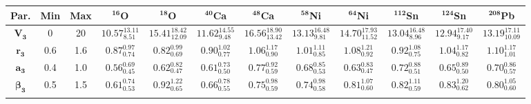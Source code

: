 \bgroup
\def\arraystretch{1.5}%
\begin{tabular}{ c c c c c c c c c c c c} 
\textbf{Par.} & \textbf{Min} & \textbf{Max} & \textbf{$\mathbf{^{16}}$O}& \textbf{$\mathbf{^{18}}$O}& \textbf{$\mathbf{^{40}}$Ca}& \textbf{$\mathbf{^{48}}$Ca}& \textbf{$\mathbf{^{58}}$Ni}& \textbf{$\mathbf{^{64}}$Ni}& \textbf{$\mathbf{^{112}}$Sn}& \textbf{$\mathbf{^{124}}$Sn}& \textbf{$\mathbf{^{208}}$Pb}\\
 \hline 
$\mathbf{V_{3}}$ & 0 & 20 & $10.57^{13.11}_{8.51}$ & $15.41^{18.42}_{12.09}$ & $11.62^{14.55}_{9.48}$ & $16.56^{18.90}_{13.42}$ & $13.13^{16.48}_{9.81}$ & $14.70^{17.93}_{11.52}$ & $13.04^{16.48}_{8.96}$ & $12.94^{17.40}_{9.17}$ & $13.19^{17.11}_{10.09}$\\ 
$\mathbf{r_{3}}$ & 0.6 & 1.6 & $0.87^{0.97}_{0.74}$ & $0.82^{0.99}_{0.69}$ & $0.90^{1.02}_{0.77}$ & $1.06^{1.17}_{0.90}$ & $1.01^{1.11}_{0.85}$ & $1.08^{1.21}_{0.92}$ & $0.92^{1.08}_{0.75}$ & $1.04^{1.17}_{0.82}$ & $1.10^{1.17}_{1.01}$\\ 
$\mathbf{a_{3}}$ & 0.4 & 1.0 & $0.56^{0.69}_{0.45}$ & $0.62^{0.82}_{0.47}$ & $0.61^{0.73}_{0.50}$ & $0.77^{0.92}_{0.59}$ & $0.68^{0.85}_{0.53}$ & $0.63^{0.83}_{0.47}$ & $0.72^{0.88}_{0.51}$ & $0.65^{0.89}_{0.50}$ & $0.70^{0.86}_{0.57}$\\ 
$\mathbf{\beta_{3}}$ & 0.5 & 1.5 & $0.61^{0.74}_{0.53}$ & $0.92^{1.22}_{0.65}$ & $0.66^{0.78}_{0.55}$ & $0.75^{0.98}_{0.59}$ & $0.74^{0.98}_{0.58}$ & $0.81^{1.07}_{0.60}$ & $0.82^{1.11}_{0.59}$ & $0.83^{1.20}_{0.62}$ & $0.80^{1.05}_{0.60}$\\ 
\\ 
\end{tabular}
\egroup